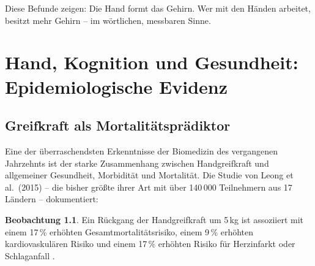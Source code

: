 ﻿\documentclass[12pt,a4paper]{report}
\theoremstyle{plain}
\theoremstyle{definition}
\newtheorem{beobachtung}[theorem]{Beobachtung}
\theoremstyle{remark}
\begin{document}
Diese Befunde zeigen: Die Hand formt das Gehirn. Wer mit den Händen
arbeitet, besitzt mehr Gehirn -- im wörtlichen, messbaren Sinne.

\chapter{Hand, Kognition und Gesundheit: Epidemiologische Evidenz}
\label{chap:kognition}

\section{Greifkraft als Mortalitätsprädiktor}

Eine der überraschendsten Erkenntnisse der Biomedizin des vergangenen
Jahrzehnts ist der starke Zusammenhang zwischen Handgreifkraft und
allgemeiner Gesundheit, Morbidität und Mortalität. Die Studie von
Leong et al.\ (2015) -- die bisher größte ihrer Art mit über 140\,000
Teilnehmern aus 17 Ländern -- dokumentiert:

\begin{beobachtung}
Ein Rückgang der Handgreifkraft um 5\,kg ist assoziiert mit
einem 17\,\% erhöhten Gesamtmortalitätsrisiko, einem 9\,\% erhöhten
kardiovaskulären Risiko und einem 17\,\% erhöhten Risiko für
Herzinfarkt oder Schlaganfall \cite{leong2015}.
\end{beobachtung}
\end{document}
